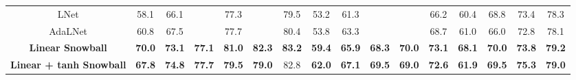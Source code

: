 \begin{table*}[htbp]
\begin{tabular}{c|cccccc|ccccc|cccc}
    LNet  & \cellcolor[rgb]{ .894,  .894,  .514}58.1 & \cellcolor[rgb]{ .918,  .898,  .514}66.1 &       & \cellcolor[rgb]{ .922,  .902,  .514}77.3 &       & \cellcolor[rgb]{ .996,  .871,  .506}79.5 & \cellcolor[rgb]{ .843,  .878,  .51}53.2 & \cellcolor[rgb]{ .933,  .906,  .518}61.3 &       &       & \cellcolor[rgb]{ .988,  .725,  .478}66.2 & \cellcolor[rgb]{ .937,  .906,  .518}60.4 & \cellcolor[rgb]{ .706,  .839,  .502}68.8 & \cellcolor[rgb]{ .929,  .902,  .514}73.4 & \cellcolor[rgb]{ .89,  .89,  .514}78.3 \\
    AdaLNet & \cellcolor[rgb]{ .812,  .871,  .51}60.8 & \cellcolor[rgb]{ .859,  .882,  .51}67.5 &       & \cellcolor[rgb]{ .875,  .886,  .514}77.7 &       & \cellcolor[rgb]{ .941,  .906,  .518}80.4 & \cellcolor[rgb]{ .82,  .871,  .51}53.8 & \cellcolor[rgb]{ .792,  .863,  .506}63.3 &       &       & \cellcolor[rgb]{ .996,  .894,  .51}68.7 & \cellcolor[rgb]{ .906,  .898,  .514}61.0 & \cellcolor[rgb]{ .941,  .906,  .518}66.0 & \cellcolor[rgb]{ .996,  .918,  .514}72.8 & \cellcolor[rgb]{ .953,  .91,  .518}78.1 \\
    \midrule
    \textbf{Linear Snowball} & \cellcolor[rgb]{ .537,  .788,  .494}\textbf{70.0} & \cellcolor[rgb]{ .612,  .812,  .498}\textbf{73.1} & \cellcolor[rgb]{ .996,  .867,  .506}\textbf{77.1} & \cellcolor[rgb]{ .502,  .78,  .49}\textbf{81.0} & \cellcolor[rgb]{ .608,  .812,  .498}\textbf{82.3} & \cellcolor[rgb]{ .455,  .765,  .486}\textbf{83.2} & \cellcolor[rgb]{ .596,  .808,  .498}\textbf{59.4} & \cellcolor[rgb]{ .616,  .812,  .498}\textbf{65.9} & \cellcolor[rgb]{ .996,  .851,  .502}\textbf{68.3} & \cellcolor[rgb]{ .792,  .863,  .506}\textbf{70.0} & \cellcolor[rgb]{ .455,  .765,  .486}\textbf{73.1} & \cellcolor[rgb]{ .541,  .792,  .494}\textbf{68.1} & \cellcolor[rgb]{ .604,  .808,  .498}\textbf{70.0} & \cellcolor[rgb]{ .871,  .886,  .514}\textbf{73.8} & \cellcolor[rgb]{ .592,  .804,  .494}\textbf{79.2} \\
    \textbf{Linear + tanh Snowball} & \cellcolor[rgb]{ .604,  .808,  .498}\textbf{67.8} & \cellcolor[rgb]{ .537,  .788,  .494}\textbf{74.8} & \cellcolor[rgb]{ 1,  .922,  .518}\textbf{77.7} & \cellcolor[rgb]{ .667,  .827,  .502}\textbf{79.5} & \cellcolor[rgb]{ .976,  .502,  .435}\textbf{79.0} & \cellcolor[rgb]{ .522,  .784,  .49}82.8 & \cellcolor[rgb]{ .494,  .776,  .49}\textbf{62.0} & \cellcolor[rgb]{ .529,  .788,  .494}\textbf{67.1} & \cellcolor[rgb]{ .788,  .863,  .506}\textbf{69.5} & \cellcolor[rgb]{ .992,  .827,  .498}\textbf{69.0} & \cellcolor[rgb]{ .529,  .788,  .494}\textbf{72.6} & \cellcolor[rgb]{ .859,  .882,  .51}\textbf{61.9} & \cellcolor[rgb]{ .651,  .824,  .498}\textbf{69.5} & \cellcolor[rgb]{ .663,  .824,  .498}\textbf{75.3} & \cellcolor[rgb]{ .651,  .824,  .498}\textbf{79.0} \\

\end{tabular}
\end{table*}

